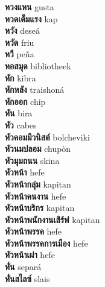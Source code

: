\textbf{ หวงแหน  } gusta \\
\textbf{ หวดเต็มแรง  } kap \\
\textbf{ หวัง  } deseá \\
\textbf{ หวัด  } friu \\
\textbf{ หวี  } peña \\
\textbf{ หอสมุด  } bibliotheek \\
\textbf{ หัก  } kibra \\
\textbf{ หักหลัง  } traishoná \\
\textbf{ หักออก  } chip \\
\textbf{ หัน  } bira \\
\textbf{ หัว  } cabes \\
\textbf{ หัวคอมมิวนิสต์  } bolcheviki \\
\textbf{ หัวนมปลอม  } chupòn \\
\textbf{ หัวมุมถนน  } skina \\
\textbf{ หัวหน้า  } hefe \\
\textbf{ หัวหน้ากลุ่ม  } kapitan \\
\textbf{ หัวหน้าคนงาน  } hefe \\
\textbf{ หัวหน้าบริกร  } kapitan \\
\textbf{ หัวหน้าพนักงานเสิร์ฟ  } kapitan \\
\textbf{ หัวหน้าพรรค  } hefe \\
\textbf{ หัวหน้าพรรคการเมือง  } hefe \\
\textbf{ หัวหน้าเผ่า  } hefe \\
\textbf{ หั่น  } separá \\
\textbf{ หั่นสไลซ์  } slais \\
